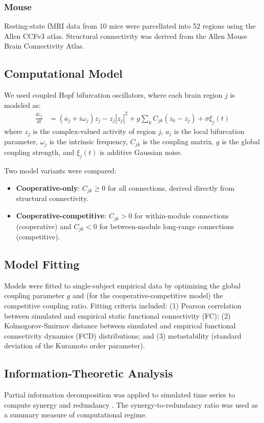 \documentclass[11pt]{article}
\begin{document}
\subsubsection{Mouse}
Resting-state fMRI data from 10 mice were parcellated into 52 regions using the Allen CCFv3 atlas. Structural connectivity was derived from the Allen Mouse Brain Connectivity Atlas.

\subsection{Computational Model}
We used coupled Hopf bifurcation oscillators, where each brain region $j$ is modeled as:
\begin{align}
\frac{dz_j}{dt} &= (a_j + i\omega_j)z_j - z_j|z_j|^2 + g \sum_k C_{jk} (z_k - z_j) + \sigma \xi_j(t)
\end{align}
where $z_j$ is the complex-valued activity of region $j$, $a_j$ is the local bifurcation parameter, $\omega_j$ is the intrinsic frequency, $C_{jk}$ is the coupling matrix, $g$ is the global coupling strength, and $\xi_j(t)$ is additive Gaussian noise.

Two model variants were compared:
\begin{itemize}
    \item \textbf{Cooperative-only}: $C_{jk} \geq 0$ for all connections, derived directly from structural connectivity.
    \item \textbf{Cooperative-competitive}: $C_{jk} > 0$ for within-module connections (cooperative) and $C_{jk} < 0$ for between-module long-range connections (competitive).
\end{itemize}

\subsection{Model Fitting}
Models were fitted to single-subject empirical data by optimizing the global coupling parameter $g$ and (for the cooperative-competitive model) the competitive coupling ratio. Fitting criteria included: (1) Pearson correlation between simulated and empirical static functional connectivity (FC); (2) Kolmogorov-Smirnov distance between simulated and empirical functional connectivity dynamics (FCD) distributions; and (3) metastability (standard deviation of the Kuramoto order parameter).

\subsection{Information-Theoretic Analysis}
Partial information decomposition was applied to simulated time series to compute synergy and redundancy \citep{williams2010nonnegative}. The synergy-to-redundancy ratio was used as a summary measure of computational regime.
\end{document}
